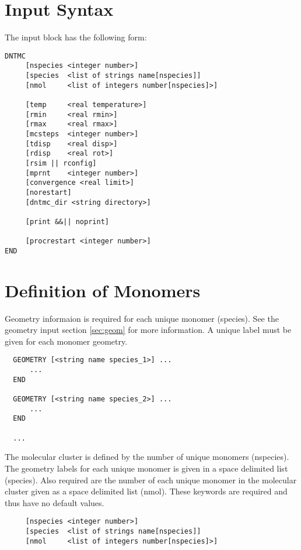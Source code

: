 \newpage
\section{Input Syntax}

The input block has the following form:

\begin{verbatim}
DNTMC
     [nspecies <integer number>]
     [species  <list of strings name[nspecies]]
     [nmol     <list of integers number[nspecies]>]

     [temp     <real temperature>]
     [rmin     <real rmin>]
     [rmax     <real rmax>]
     [mcsteps  <integer number>]
     [tdisp    <real disp>]
     [rdisp    <real rot>]
     [rsim || rconfig]
     [mprnt    <integer number>]
     [convergence <real limit>]
     [norestart]
     [dntmc_dir <string directory>]

     [print &&|| noprint]

     [procrestart <integer number>]
END
\end{verbatim}

\section{Definition of Monomers}

Geometry informaion is required for each unique monomer (species).
See the geometry input section \ref{sec:geom} for more information.
A unique label must be given for each monomer geometry.

\begin{verbatim}
  GEOMETRY [<string name species_1>] ...
      ...
  END

  GEOMETRY [<string name species_2>] ...
      ...
  END

  ...
\end{verbatim}

The molecular cluster is defined by the number of unique monomers
(nspecies).  The geometry labels for each unique monomer is given in
a space delimited list (species).  Also required are the number of
each unique monomer in the molecular cluster given as a space
delimited list (nmol).  These keywords are required and thus have no
default values.

\begin{verbatim}
     [nspecies <integer number>]
     [species  <list of strings name[nspecies]]
     [nmol     <list of integers number[nspecies]>]
\end{verbatim}

